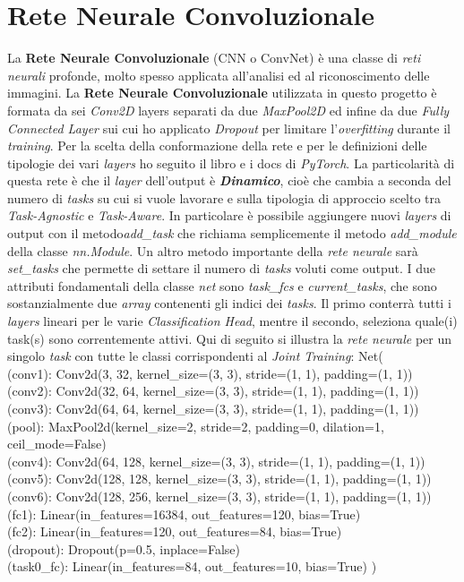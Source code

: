 \section{Rete Neurale Convoluzionale}
La \textbf{Rete Neurale Convoluzionale} (CNN o ConvNet) è una classe di \textit{reti neurali} profonde, molto spesso  applicata all'analisi ed al riconoscimento delle immagini.
La \textbf{Rete Neurale Convoluzionale} utilizzata in questo progetto è formata da sei \textit{Conv2D} layers separati da due \textit{MaxPool2D} ed infine da due \textit{Fully Connected Layer} sui cui ho applicato \textit{Dropout} per limitare l'\textit{overfitting} durante il \textit{training}. Per la scelta della conformazione della rete e per le definizioni delle tipologie dei vari \textit{layers} ho seguito il libro \cite{DeepLearningPython} e i docs di \textit{PyTorch}.
La particolarità di questa rete è che il \textit{layer} dell'output è \textbf{\textit{Dinamico}}, cioè che cambia a seconda del numero di \textit{tasks} su cui si vuole lavorare e sulla tipologia di approccio scelto tra \textit{Task-Agnostic} e \textit{Task-Aware}.
In particolare è possibile aggiungere nuovi \textit{layers} di output con il metodo\textit{add\_task} che richiama semplicemente il metodo \textit{add\_module} della classe \textit{nn.Module}.
Un altro metodo importante della \textit{rete neurale} sarà  \textit{set\_tasks} che  permette di settare il numero di \textit{tasks} voluti come output. I due attributi fondamentali della classe \textit{net} sono \textit{task\_fcs} e \textit{current\_tasks}, che sono sostanzialmente due \textit{array} contenenti gli indici dei \textit{tasks}. Il primo conterrà tutti i \textit{layers} lineari per le varie  \textit{Classification Head}, mentre il secondo, seleziona quale(i) task(s) sono correntemente attivi.
Qui di seguito si illustra la \textit{rete neurale} per un singolo \textit{task} con tutte le classi corrispondenti al \textit{Joint Training}:
Net(\\
  (conv1): Conv2d(3, 32, kernel_size=(3, 3), stride=(1, 1), padding=(1, 1))\\
  (conv2): Conv2d(32, 64, kernel_size=(3, 3), stride=(1, 1), padding=(1, 1))\\
  (conv3): Conv2d(64, 64, kernel_size=(3, 3), stride=(1, 1), padding=(1, 1))\\
  (pool): MaxPool2d(kernel_size=2, stride=2, padding=0, dilation=1, ceil_mode=False)\\
  (conv4): Conv2d(64, 128, kernel_size=(3, 3), stride=(1, 1), padding=(1, 1))\\
  (conv5): Conv2d(128, 128, kernel_size=(3, 3), stride=(1, 1), padding=(1, 1))\\
  (conv6): Conv2d(128, 256, kernel_size=(3, 3), stride=(1, 1), padding=(1, 1))\\
  (fc1): Linear(in_features=16384, out_features=120, bias=True)\\
  (fc2): Linear(in_features=120, out_features=84, bias=True)\\
  (dropout): Dropout(p=0.5, inplace=False)\\
  (task0\_fc): Linear(in_features=84, out_features=10, bias=True) )

